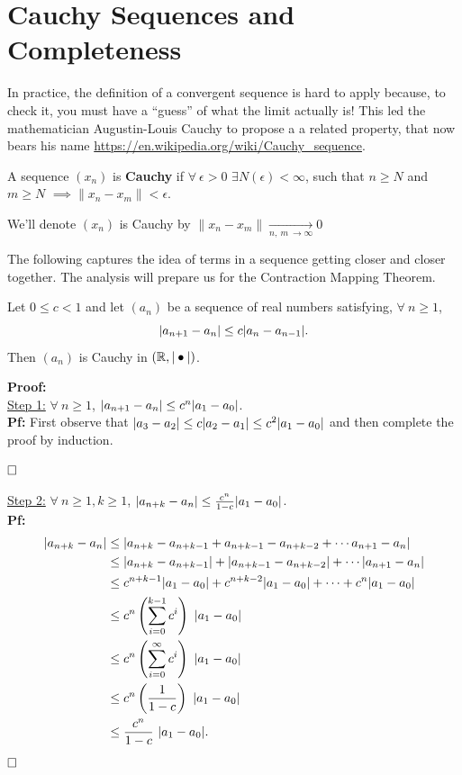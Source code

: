 \section{Cauchy Sequences and Completeness}

In practice, the definition of a convergent sequence is hard to apply because, to check it, you must have a ``guess'' of what the limit actually is! This led the mathematician Augustin-Louis Cauchy to propose a a related property, that now bears his name \url{https://en.wikipedia.org/wiki/Cauchy_sequence}.\\ 

\begin{definition}
A sequence $(x_n)$ is \textbf{Cauchy} if $\forall~\epsilon >0$  $\exists N(\epsilon) <\infty$, such that $n \geq N$ and $ m \geq N$ $\implies \| x_n - x_m\| < \epsilon$.
\end{definition}

\begin{notation} We'll denote $(x_n)$ is Cauchy by $\|x_n-x_m\|\xrightarrow[n,\ m ~\to \infty]{}0$

\end{notation} 

The following captures the idea of terms in a sequence getting closer and closer together. The analysis will prepare us for the Contraction Mapping Theorem.

\begin{lem} Let $0 \le c <1$ and let $(a_n)$ be a sequence of real numbers satisfying, $\forall~n\ge 1$,
 $$|a_{n+1}-a_{n}| \le c | a_{n}-a_{n-1}|. $$
 Then $(a_n)$ is Cauchy in $(\mathbb R, | \bullet |)$.
\end{lem}

\textbf{Proof:}\\

\ul{Step 1:}  $\forall ~n\ge 1$, $|a_{n+1}-a_{n}| \le c^n |a_1-a_0|$.\\

\textbf{Pf:} First observe that $|a_{3}-a_{2}|\le c|a_{2}-a_{1}| \le c^2|a_1-a_0|$ and then complete the proof by induction. 

$\hfill \square$

\ul{Step 2:} $\forall ~n\ge 1, k \ge 1$, $|a_{n+k}-a_{n}| \le \frac{c^n}{1-c} |a_1-a_0|$.\\

\textbf{Pf:}
\begin{align*}
|a_{n+k}-a_{n}| &\le | a_{n+k}-a_{n+k-1} + a_{n+k-1}-a_{n+k-2} +\cdots a_{n+1}-a_{n}| \\
&\le | a_{n+k}-a_{n+k-1}| + |a_{n+k-1}-a_{n+k-2}| +\cdots |a_{n+1}-a_{n}| \\
&\le c^{n+k-1}|a_1-a_0| + c^{n+k-2}|a_1-a_0| + \cdots + c^n |a_1-a_0|  \\
&\le c^n \left( \sum_{i=0}^{k-1} c^i \right)~ |a_1-a_0| \\
&\le c^n \left(\sum_{i=0}^{\infty} c^i \right)~ |a_1-a_0| \\
&\le c^n \left( \frac{1}{1-c} \right) ~ |a_1-a_0|\\
&\le  \frac{c^n }{1-c}~|a_1-a_0|.
\end{align*}
$\hfill \square$

